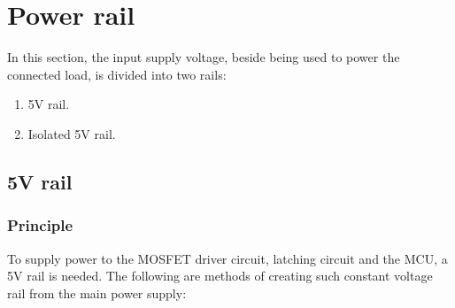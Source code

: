 \documentclass[../main.tex]{subfiles}
\begin{document}
    \section{Power rail}
    \justify
    In this section, the input supply voltage, beside being used to power the connected load, is divided into two rails:
    \begin{enumerate}
        \item 5V rail.
        \item Isolated 5V rail.
    \end{enumerate}
    
    \pagebreak
    \subsection{5V rail}

    \subsubsection{Principle}
    \justify
    To supply power to the MOSFET driver circuit, latching circuit and the MCU, a 5V rail is needed. The following are methods of creating such constant voltage rail from the main power supply:
\end{document}
